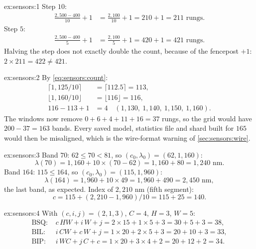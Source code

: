
\begin{solution}{ex:sensors:1}
Step $10$:
\begin{align*}
\frac{2{,}500 - 400}{10} + 1 &= \frac{2{,}100}{10} + 1 = 210 + 1 = 211 \text{ rungs.}
\end{align*}
Step $5$:
\begin{align*}
\frac{2{,}500 - 400}{5} + 1 &= \frac{2{,}100}{5} + 1 = 420 + 1 = 421 \text{ rungs.}
\end{align*}
Halving the step does not exactly double the count, because of the fencepost $+1$:
$2 \times 211 = 422 \ne 421$.
\end{solution}

\begin{solution}{ex:sensors:2}
By \cref{eq:sensors:count}:
\begin{align*}
\lceil 1{,}125/10 \rceil &= \lceil 112.5 \rceil = 113,\\
\lfloor 1{,}160/10 \rfloor &= \lfloor 116 \rfloor = 116,\\
116 - 113 + 1 &= 4 \quad (1{,}130,\ 1{,}140,\ 1{,}150,\ 1{,}160).
\end{align*}
The windows now remove $0 + 6 + 4 + 11 + 16 = 37$ rungs, so the grid would have
$200 - 37 = 163$ bands. Every saved model, statistics file and shard built for $165$ would then be
misaligned, which is the wire-format warning of \cref{sec:sensors:wire}.
\end{solution}

\begin{solution}{ex:sensors:3}
Band $70$: $62 \le 70 < 81$, so $(c_0, \lambda_0) = (62, 1{,}160)$:
\[ \lambda(70) = 1{,}160 + 10 \times (70 - 62) = 1{,}160 + 80 = 1{,}240 \text{ nm}. \]
Band $164$: $115 \le 164$, so $(c_0, \lambda_0) = (115, 1{,}960)$:
\[ \lambda(164) = 1{,}960 + 10 \times 49 = 1{,}960 + 490 = 2{,}450 \text{ nm}, \]
the last band, as expected. Index of $2{,}210$ nm (fifth segment):
\[ c = 115 + (2{,}210 - 1{,}960)/10 = 115 + 25 = 140. \]
\end{solution}

\begin{solution}{ex:sensors:4}
With $(c, i, j) = (2, 1, 3)$, $C = 4$, $H = 3$, $W = 5$:
\begin{align*}
\text{BSQ: } & c\,HW + i\,W + j = 2 \times 15 + 1 \times 5 + 3 = 30 + 5 + 3 = 38,\\
\text{BIL: } & i\,CW + c\,W + j = 1 \times 20 + 2 \times 5 + 3 = 20 + 10 + 3 = 33,\\
\text{BIP: } & i\,WC + j\,C + c = 1 \times 20 + 3 \times 4 + 2 = 20 + 12 + 2 = 34.
\end{align*}
\end{solution}

